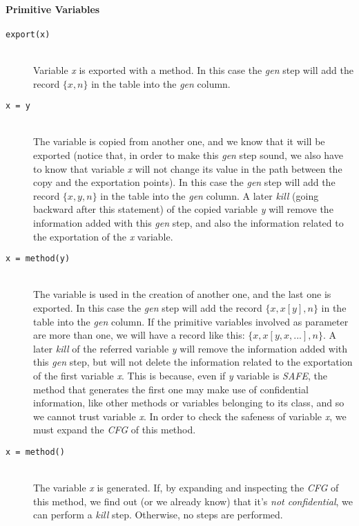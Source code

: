 \documentclass[letterpaper,twocolumn,10pt]{article}
\begin{document}
\noindent \paragraph{Primitive Variables}
\begin{description}

\item[\texttt{export(x)}] \hfill \\
Variable \emph{x} is exported with a method. In this case the \emph{gen} step will add the record $\{x, n\}$ in the table into the \emph{gen} column.

\item[\texttt{x = y}] \hfill \\
The variable is copied from another one, and we know that it will be exported (notice that, in order to make this \emph{gen} step sound, we also have to know that variable \emph{x} will not change its value in the path between the copy and the exportation points). In this case the \emph{gen} step will add the record $\{x, y, n\}$ in the table into the \emph{gen} column. A later \emph{kill} (going backward after this statement) of the copied variable \emph{y} will remove the information added with this \emph{gen} step, and also the information related to the exportation of the \emph{x} variable.

\item[\texttt{x = method(y)}] \hfill \\
The variable is used in the creation of another one, and the last one is exported. In this case the \emph{gen} step will add the record $\{x, x[y], n\}$ in the table into the \emph{gen} column. If the primitive variables involved as parameter are more than one, we will have a record like this: $\{x, x[y,x,...], n\}$.  A later \emph{kill} of the referred variable \emph{y} will remove the information added with this \emph{gen} step, but will not delete the information related to the exportation of the first variable \emph{x}. This is because, even if \emph{y} variable is \emph{SAFE}, the method that generates the first one may make use of confidential information, like other methods or variables belonging to its class, and so we cannot trust variable \emph{x}. In order to check the safeness of variable \emph{x}, we must expand the \emph{CFG} of this method.

\item[\texttt{x = method()}] \hfill \\
The variable \emph{x} is generated. If, by expanding and inspecting the \emph{CFG} of this method, we find out (or we already know) that it's \emph{not confidential}, we can perform a \emph{kill} step. Otherwise, no steps are performed.

\end{description}
\end{document}
